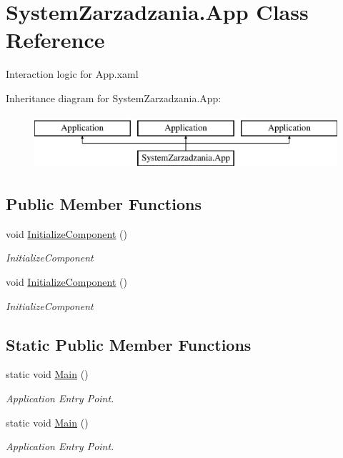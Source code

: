 \hypertarget{class_system_zarzadzania_1_1_app}{}\section{System\+Zarzadzania.\+App Class Reference}
\label{class_system_zarzadzania_1_1_app}


Interaction logic for App.\+xaml  


Inheritance diagram for System\+Zarzadzania.\+App\+:\begin{figure}[H]
\begin{center}
\leavevmode
\includegraphics[height=2.000000cm]{class_system_zarzadzania_1_1_app}
\end{center}
\end{figure}
\subsection*{Public Member Functions}
\begin{DoxyCompactItemize}
\item 
void \mbox{\hyperlink{class_system_zarzadzania_1_1_app_ac1f3db202350dcc6d30936a6ddf65a86}{Initialize\+Component}} ()
\begin{DoxyCompactList}\small\item\em Initialize\+Component \end{DoxyCompactList}\item 
void \mbox{\hyperlink{class_system_zarzadzania_1_1_app_ac1f3db202350dcc6d30936a6ddf65a86}{Initialize\+Component}} ()
\begin{DoxyCompactList}\small\item\em Initialize\+Component \end{DoxyCompactList}\end{DoxyCompactItemize}
\subsection*{Static Public Member Functions}
\begin{DoxyCompactItemize}
\item 
static void \mbox{\hyperlink{class_system_zarzadzania_1_1_app_afc35a78a384092bf9baa0d4c310c2ebe}{Main}} ()
\begin{DoxyCompactList}\small\item\em Application Entry Point. \end{DoxyCompactList}\item 
static void \mbox{\hyperlink{class_system_zarzadzania_1_1_app_afc35a78a384092bf9baa0d4c310c2ebe}{Main}} ()
\begin{DoxyCompactList}\small\item\em Application Entry Point. \end{DoxyCompactList}\end{DoxyCompactItemize}


